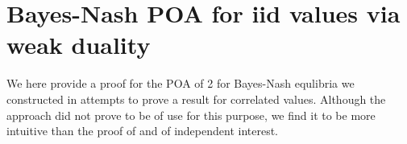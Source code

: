 \section{Bayes-Nash POA for iid values via weak duality} 
We here provide a proof for the POA of 2 for Bayes-Nash equlibria we constructed in attempts to prove a result for correlated values. Although the approach did not prove to be of use for this purpose, we find it to be more intuitive than the proof of \cite{survey} and of independent interest.